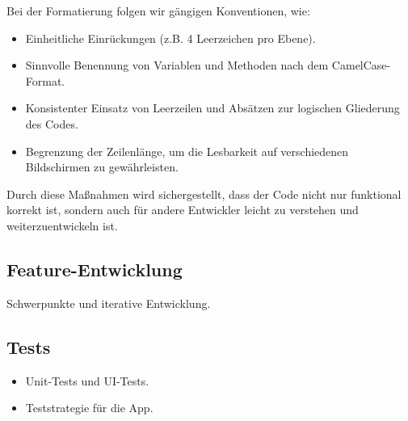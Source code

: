 Bei der Formatierung folgen wir gängigen Konventionen, wie:
\begin{itemize}
    \item Einheitliche Einrückungen (z.B. 4 Leerzeichen pro Ebene).
    \item Sinnvolle Benennung von Variablen und Methoden nach dem CamelCase-Format.
    \item Konsistenter Einsatz von Leerzeilen und Absätzen zur logischen Gliederung des Codes.
    \item Begrenzung der Zeilenlänge, um die Lesbarkeit auf verschiedenen Bildschirmen zu gewährleisten.
\end{itemize}

Durch diese Maßnahmen wird sichergestellt, dass der Code nicht nur funktional korrekt ist, sondern auch für andere Entwickler leicht zu verstehen und weiterzuentwickeln ist.

\subsection{Feature-Entwicklung}
Schwerpunkte und iterative Entwicklung.

\subsection{Tests}
\begin{itemize}
    \item Unit-Tests und UI-Tests.
    \item Teststrategie für die App.
\end{itemize}
